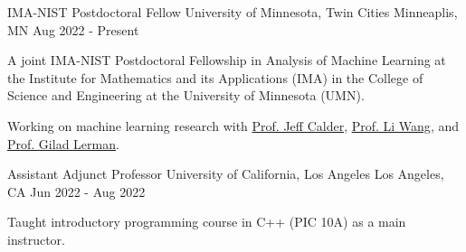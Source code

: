 

\begin{cventries}

  \cventry
    {IMA-NIST Postdoctoral Fellow} %
    {University of Minnesota, Twin Cities} %
    {Minneaplis, MN} %
    {Aug 2022 - Present} %
    {
      \begin{cvitems} %
        \item {A joint IMA-NIST Postdoctoral Fellowship in Analysis of Machine Learning at the Institute for Mathematics and its Applications (IMA) in the College of Science and Engineering at the University of Minnesota (UMN).}
        \item {Working on machine learning research with \href{https://www-users.cse.umn.edu/~jwcalder/}{Prof. Jeff Calder}, \href{https://liwang-umn.github.io/math/}{Prof. Li Wang}, and \href{https://www-users.cse.umn.edu/~lerman/}{Prof. Gilad Lerman}.}
      \end{cvitems}
    }

  \cventry
    {Assistant Adjunct Professor} %
    {University of California, Los Angeles} %
    {Los Angeles, CA} %
    {Jun 2022 - Aug 2022} %
    {
      \begin{cvitems} %
        \item {Taught introductory programming course in C++ (PIC 10A) as a main instructor.}
      \end{cvitems}
    }

\end{cventries}
